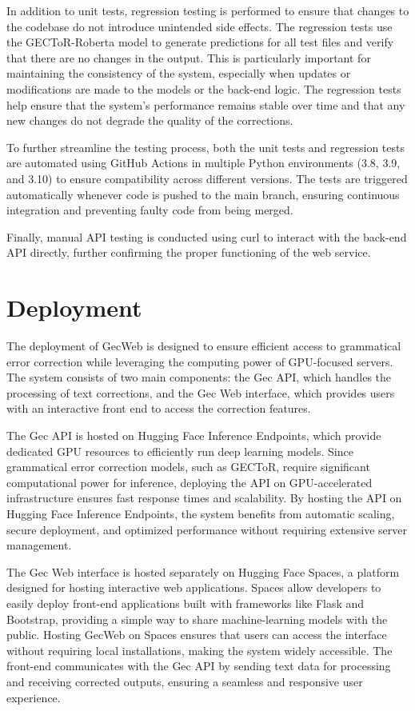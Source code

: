 In addition to unit tests, regression testing is performed to ensure that changes to the codebase do not introduce unintended side effects.
The regression tests use the GECToR-Roberta model to generate predictions for all test files and verify that there are no changes in the output.
This is particularly important for maintaining the consistency of the system, especially when updates or modifications are made to the models or the back-end logic.
The regression tests help ensure that the system's performance remains stable over time and that any new changes do not degrade the quality of the corrections.

To further streamline the testing process, both the unit tests and regression tests are automated using GitHub Actions in multiple Python environments (3.8, 3.9, and 3.10) to ensure compatibility across different versions.
The tests are triggered automatically whenever code is pushed to the main branch, ensuring continuous integration and preventing faulty code from being merged.

Finally, manual API testing is conducted using curl to interact with the back-end API directly, further confirming the proper functioning of the web service.

\section{Deployment}

The deployment of GecWeb is designed to ensure efficient access to grammatical error correction while leveraging the computing power of GPU-focused servers.
The system consists of two main components: the Gec API, which handles the processing of text corrections, and the Gec Web interface, which provides users with an interactive front end to access the correction features.

The Gec API is hosted on Hugging Face Inference Endpoints, which provide dedicated GPU resources to efficiently run deep learning models.
Since grammatical error correction models, such as GECToR, require significant computational power for inference, deploying the API on GPU-accelerated infrastructure ensures fast response times and scalability.
By hosting the API on Hugging Face Inference Endpoints, the system benefits from automatic scaling, secure deployment, and optimized performance without requiring extensive server management.

The Gec Web interface is hosted separately on Hugging Face Spaces, a platform designed for hosting interactive web applications.
Spaces allow developers to easily deploy front-end applications built with frameworks like Flask and Bootstrap, providing a simple way to share machine-learning models with the public.
Hosting GecWeb on Spaces ensures that users can access the interface without requiring local installations, making the system widely accessible.
The front-end communicates with the Gec API by sending text data for processing and receiving corrected outputs, ensuring a seamless and responsive user experience.

